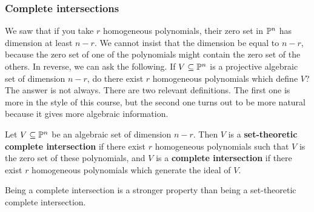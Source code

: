\subsubsection{Complete intersections}

We saw that if you take $ r $ homogeneous polynomials, their zero set in $ \mathbb{P}^n $ has dimension at least $ n - r $. We cannot insist that the dimension be equal to $ n - r $, because the zero set of one of the polynomials might contain the zero set of the others. In reverse, we can ask the following. If $ V \subseteq \mathbb{P}^n $ is a projective algebraic set of dimension $ n - r $, do there exist $ r $ homogeneous polynomials which define $ V $? The answer is not always. There are two relevant definitions. The first one is more in the style of this course, but the second one turns out to be more natural because it gives more algebraic information.

\begin{definition*}
Let $ V \subseteq \mathbb{P}^n $ be an algebraic set of dimension $ n - r $. Then $ V $ is a \textbf{set-theoretic complete intersection} if there exist $ r $ homogeneous polynomials such that $ V $ is the zero set of these polynomials, and $ V $ is a \textbf{complete intersection} if there exist $ r $ homogeneous polynomials which generate the ideal of $ V $.
\end{definition*}

Being a complete intersection is a stronger property than being a set-theoretic complete intersection.

